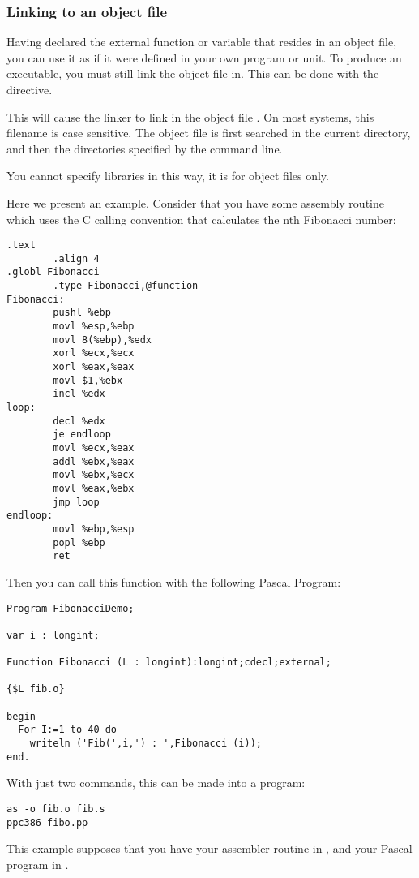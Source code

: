 \subsubsection{Linking to an object file}
\label{se:LinkIn}

Having declared the external function or variable that resides in an object file,
you can use it as if it were defined in your own program or unit.
To produce an executable, you must still link the object file in.
This can be done with the  directive.

This will cause the linker to link in the object file . On
most systems, this filename is case sensitive. The object file is
first searched in the current directory, and then the directories specified
by the  command line.

You cannot specify libraries in this way, it is for object files only.

Here we present an example. Consider that you have some assembly routine which uses
the C calling convention that calculates the nth Fibonacci number:
\begin{verbatim}
.text
        .align 4
.globl Fibonacci
        .type Fibonacci,@function
Fibonacci:
        pushl %ebp
        movl %esp,%ebp
        movl 8(%ebp),%edx
        xorl %ecx,%ecx
        xorl %eax,%eax
        movl $1,%ebx
        incl %edx
loop:
        decl %edx
        je endloop
        movl %ecx,%eax
        addl %ebx,%eax
        movl %ebx,%ecx
        movl %eax,%ebx
        jmp loop
endloop:
        movl %ebp,%esp
        popl %ebp
        ret
\end{verbatim}
Then you can call this function with the following Pascal Program:
\begin{verbatim}
Program FibonacciDemo;

var i : longint;

Function Fibonacci (L : longint):longint;cdecl;external;

{$L fib.o}

begin
  For I:=1 to 40 do
    writeln ('Fib(',i,') : ',Fibonacci (i));
end.
\end{verbatim}
With just two commands, this can be made into a program:
\begin{verbatim}
as -o fib.o fib.s
ppc386 fibo.pp
\end{verbatim}
This example supposes that you have your assembler routine in ,
and your Pascal program in .

